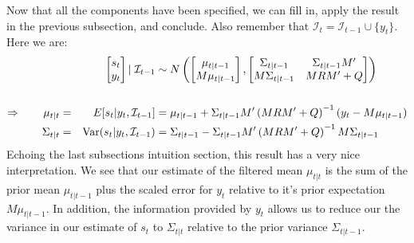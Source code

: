 \documentclass[a4paper,12pt]{article}
\begin{document}
Now that all the components have been specified, we can
fill in, apply the result in the previous subsection, and
conclude. Also remember that
$\mathcal{I}_{t}=\mathcal{I}_{t-1} \cup \{y_t\}$. Here we
are:
\begin{alignat}{3}
  &&\begin{bmatrix} s_t \\ y_t \end{bmatrix} | \; 
  \mathcal{I}_{t-1}
  &\sim 
  N\left(\begin{bmatrix} \mu_{t|t-1} \\ M\mu_{t|t-1} 
    \end{bmatrix},
  \begin{bmatrix} \Sigma_{t|t-1} & \Sigma_{t|t-1} M'
    \notag\\
  M\Sigma_{t|t-1} & MRM' + Q \end{bmatrix} 
  \right) \notag\\\label{normfilt}\\
  \Rightarrow \qquad
  \mu_{t|t} =&& E[s_t|y_t, \mathcal{I}_{t-1}]
    &= \mu_{t|t-1} + \Sigma_{t|t-1} M' 
    \left(MRM' + Q\right)^{-1} (y_t-M\mu_{t|t-1}) \notag\\
  \Sigma_{t|t} =&& 
    \text{Var}(s_t|y_t, \mathcal{I}_{t-1})
    &= \Sigma_{t|t-1} - \Sigma_{t|t-1}M' 
    \left(MRM' + Q\right)^{-1} M\Sigma_{t|t-1} \notag
\end{alignat}
Echoing the last subsections intuition section, this
result has a very nice interpretation. We see that our
estimate of the filtered mean $\mu_{t|t}$ is the sum of
the prior mean $\mu_{t|t-1}$ plus the scaled error for
$y_t$ relative to it's prior expectation $M\mu_{t|t-1}$.
In addition, the information provided by $y_t$ allows us
to reduce our the variance in our estimate of $s_t$ to
$\Sigma_{t|t}$ relative to the prior variance
$\Sigma_{t|t-1}$.
\end{document}
